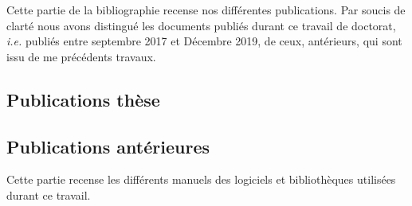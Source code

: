 \label{refs:biblio}
\printbibliography[heading=none, notkeyword={software}]


\label{ref:publi}

Cette partie de la bibliographie recense nos différentes
publications. Par soucis de clarté nous avons distingué les documents
publiés durant ce travail de doctorat, \emph{i.e.} publiés entre
septembre 2017 et Décembre 2019, de ceux, antérieurs, qui sont issu de
me précédents travaux.

\subsection*{Publications thèse}
\label{ref:publi:ths}

\begin{refsection}
  \nocite{Bunel2019,Bunel2019a,Bunel2019b,Bunel2018a,Bunel2018b}
  \newrefcontext[sorting=ynt]
  \printbibliography[heading=none]
\end{refsection}

\subsection*{Publications antérieures}
\label{ref:publi:av}

\begin{refsection}
  \nocite{Ducruet2017a,Bunel2017,Ducruet2017, Wang2017,Bunel2017a,
    Berli2018,Bunel2016,Ducruet2017b}
  \newrefcontext[sorting=ynt]
  \printbibliography[heading=none]
\end{refsection}

\label{ref:software}

Cette partie recense les différents manuels des logiciels et
bibliothèques utilisées durant ce travail.

\begin{refsection}
  \nocite{Perez2007,Hunter2007,vanderWalt2011,
    vanderWalt2014,CGAL2019,Virtanen2020}
  \newrefcontext[sorting=ynt]
  \printbibliography[heading=none, keyword={software}]
\end{refsection}
